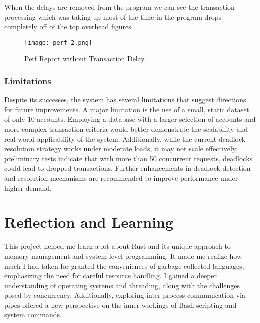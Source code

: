 \documentclass[conference]{report}
\begin{document}
When the delays are removed from the program we can see the transaction processing which was taking up most of the time in the program drops completely off of the top overhead figures.

\begin{figure}[ht]
    \centering
    \texttt{[image: perf-2.png]}
    \caption{Perf Report without Transaction Delay}
    \label{fig:perf-2}
\end{figure}

\subsection{Limitations}

Despite its successes, the system has several limitations that suggest directions for future improvements. A major limitation is the use of a small, static dataset of only 10 accounts. Employing a database with a larger selection of accounts and more complex transaction criteria would better demonstrate the scalability and real-world applicability of the system. Additionally, while the current deadlock resolution strategy works under moderate loads, it may not scale effectively; preliminary tests indicate that with more than 50 concurrent requests, deadlocks could lead to dropped transactions. Further enhancements in deadlock detection and resolution mechanisms are recommended to improve performance under higher demand.

\chapter{Reflection and Learning}

This project helped me learn a lot about Rust and its unique approach to memory management and system-level programming. It made me realize how much I had taken for granted the conveniences of garbage-collected languages, emphasizing the need for careful resource handling. I gained a deeper understanding of operating systems and threading, along with the challenges posed by concurrency. Additionally, exploring inter-process communication via pipes offered a new perspective on the inner workings of Bash scripting and system commands.


\end{document}

